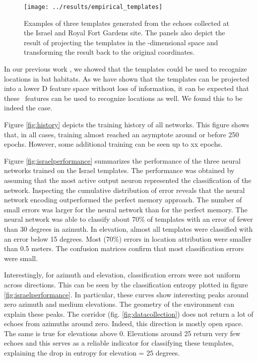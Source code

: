 \documentclass[preprint,5p]{elsarticle}
\begin{document}
\begin{figure}[tb]
	\centering
	\texttt{[image: ../results/empirical\_templates]}
	\caption{Examples of three templates generated from the echoes collected at the Israel and Royal Fort Gardens site. The panels also depict the result of projecting the templates in the 
		\pca-dimensional space and transforming the result back to the original coordinates.}
	\label{fig:empiricaltemplates}
\end{figure}

In our previous work \citep{Vanderelst2016}, we showed that the templates could be used to recognize locations in bat habitats. As we have shown that the templates can be projected into a lower \pca D feature space without loss of information, it can be expected that these \pca\ features can be used to recognize locations as well. We found this to be indeed the case.

Figure \ref{fig:history} depicts the training history of all networks. This figure shows that, in all cases, training almost reached an asymptote around or before 250 epochs. However, some additional training can be seen up to xx epochs.

Figure \ref{fig:israelperformance} summarizes the performance of the three neural networks trained on the Israel templates. The performance was obtained by assuming that the most active output neuron represented the classification of the network. Inspecting the cumulative distribution of error reveals that the neural network encoding outperformed the perfect memory approach. The number of small errors was larger for the neural network than for the perfect memory. The neural network was able to classify about 70\% of templates with an error of fewer than 30 degrees in azimuth. In elevation, almost all templates were classified with an error below 15 degrees. Most (70\%) errors in location attribution were smaller than 0.5 meters. The confusion matrices confirm that most classification errors were small.

Interestingly, for azimuth and elevation, classification errors were not uniform across directions. This can be seen by the classification entropy plotted in figure \ref{fig:israelperformance}. In particular, these curves show interesting peaks around zero azimuth and medium elevations. The geometry of the environment can explain these peaks. The corridor (fig. \ref{fig:datacollection}) does not return a lot of echoes from azimuths around zero. Indeed, this direction is mostly open space. The same is true for elevations above 0. Elevations around 25 return very few echoes and this serves as a reliable indicator for classifying these templates, explaining the drop in entropy for elevation = 25 degrees.
\end{document}
